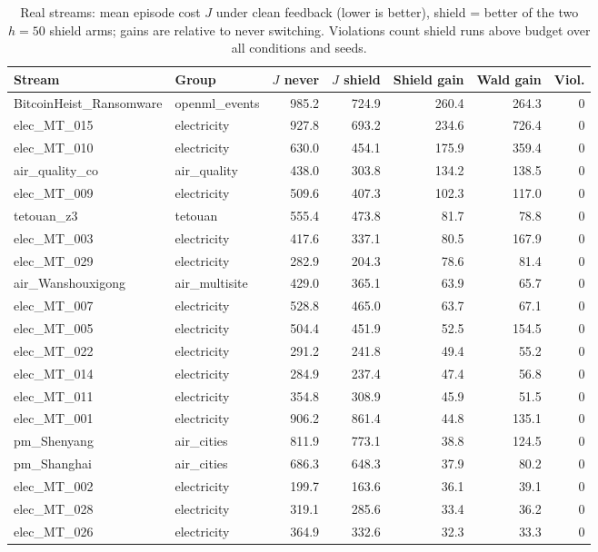 \begin{table}[t]
\centering\small
\caption{Real streams: mean episode cost $J$ under clean feedback (lower is better), shield = better of the two $h{=}50$ shield arms; gains are relative to never switching. Violations count shield runs above budget over all conditions and seeds.}
\label{tab:real48}
\begin{tabular}{llrrrrr}
\toprule
Stream & Group & $J$ never & $J$ shield & Shield gain & Wald gain & Viol.\\
\midrule
BitcoinHeist\_Ransomware & openml\_events & 985.2 & 724.9 & 260.4 & 264.3 & 0\\
elec\_MT\_015 & electricity & 927.8 & 693.2 & 234.6 & 726.4 & 0\\
elec\_MT\_010 & electricity & 630.0 & 454.1 & 175.9 & 359.4 & 0\\
air\_quality\_co & air\_quality & 438.0 & 303.8 & 134.2 & 138.5 & 0\\
elec\_MT\_009 & electricity & 509.6 & 407.3 & 102.3 & 117.0 & 0\\
tetouan\_z3 & tetouan & 555.4 & 473.8 & 81.7 & 78.8 & 0\\
elec\_MT\_003 & electricity & 417.6 & 337.1 & 80.5 & 167.9 & 0\\
elec\_MT\_029 & electricity & 282.9 & 204.3 & 78.6 & 81.4 & 0\\
air\_Wanshouxigong & air\_multisite & 429.0 & 365.1 & 63.9 & 65.7 & 0\\
elec\_MT\_007 & electricity & 528.8 & 465.0 & 63.7 & 67.1 & 0\\
elec\_MT\_005 & electricity & 504.4 & 451.9 & 52.5 & 154.5 & 0\\
elec\_MT\_022 & electricity & 291.2 & 241.8 & 49.4 & 55.2 & 0\\
elec\_MT\_014 & electricity & 284.9 & 237.4 & 47.4 & 56.8 & 0\\
elec\_MT\_011 & electricity & 354.8 & 308.9 & 45.9 & 51.5 & 0\\
elec\_MT\_001 & electricity & 906.2 & 861.4 & 44.8 & 135.1 & 0\\
pm\_Shenyang & air\_cities & 811.9 & 773.1 & 38.8 & 124.5 & 0\\
pm\_Shanghai & air\_cities & 686.3 & 648.3 & 37.9 & 80.2 & 0\\
elec\_MT\_002 & electricity & 199.7 & 163.6 & 36.1 & 39.1 & 0\\
elec\_MT\_028 & electricity & 319.1 & 285.6 & 33.4 & 36.2 & 0\\
elec\_MT\_026 & electricity & 364.9 & 332.6 & 32.3 & 33.3 & 0\\

\end{tabular}
\end{table}
